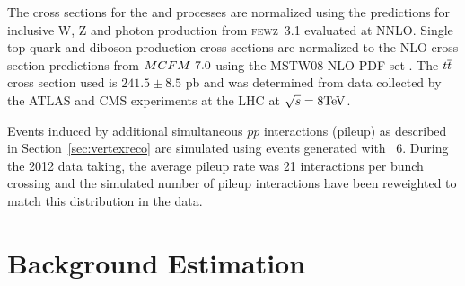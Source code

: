 The cross sections for the \vjets and \gjets processes
 are normalized using the predictions
 for inclusive W, Z and photon production from
 \textsc{fewz~3.1} \cite {Gavin:2012sy,ref:FEWZ3.1}
 evaluated at NNLO.
Single top quark and diboson production cross sections are
 normalized to the NLO
 cross section predictions from ${MCFM}~7.0$ \cite {Campbell:2010ff, Badger:2010mg}
 using the MSTW08 NLO PDF set \cite{Martin:2009iq}.
The $t\overline{t}$ cross section used is $241.5\pm8.5$ pb and
 was determined from data collected by the ATLAS and CMS
 experiments \cite{CMS:2014gta,Aad:2014kva,Chatrchyan:2013faa}
 at the LHC at $\sqrt{s}=8\mathrm{TeV}$.

Events induced by additional simultaneous $pp$ interactions
 (pileup) as described in Section~\ref{sec:vertexreco}
 are simulated using events generated with \textsc{\PYTHIA~6}.
During the 2012 data taking, the average pileup rate was
 21 interactions per bunch crossing and
 the simulated number of pileup interactions
 have been reweighted to match this distribution in the data.


\section{Background Estimation}

